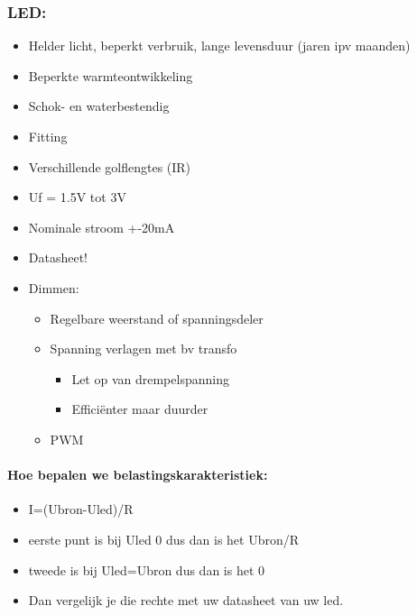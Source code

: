 \documentclass[12pt]{article}
\begin{document}
\subsubsection{LED:}
\begin{itemize}
    \item Helder licht, beperkt verbruik, lange levensduur (jaren ipv maanden) 
    \item Beperkte warmteontwikkeling
    \item Schok- en waterbestendig
    \item Fitting
    \item Verschillende golflengtes (IR)
    \item Uf = 1.5V tot 3V
    \item Nominale stroom +-20mA
    \item Datasheet!
\end{itemize}
\begin{itemize}
    \item Dimmen:\begin{itemize}
        \item Regelbare weerstand of spanningsdeler
        \item Spanning verlagen met bv transfo\begin{itemize}
            \item Let op van drempelspanning
            \item Efficiënter maar duurder
        \end{itemize}
        \item PWM
    \end{itemize}
\end{itemize}
\paragraph{Hoe bepalen we belastingskarakteristiek:}\begin{itemize}
    \item I=(Ubron-Uled)/R
    \item eerste punt is bij Uled 0 dus dan is het Ubron/R 
    \item tweede is bij Uled=Ubron dus dan is het 0
    \item Dan vergelijk je die rechte met uw datasheet van uw led.
\end{itemize}
\end{document}
